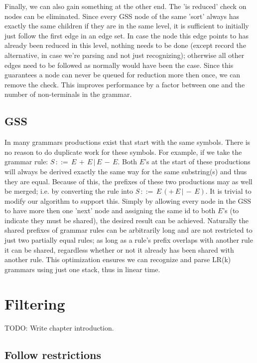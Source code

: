 \documentclass[a4paper,10pt]{article}
\begin{document}
Finally, we can also gain something at the other end. The 'is reduced' check on nodes can be eliminated. Since every GSS node of the same 'sort' always has exactly the same children if they are in the same level, it is sufficient to initially just follow the first edge in an edge set. In case the node this edge points to has already been reduced in this level, nothing needs to be done (except record the alternative, in case we're parsing and not just recognizing); otherwise all other edges need to be followed as normally would have been the case. Since this guarantees a node can never be queued for reduction more then once, we can remove the check. This improves performance by a factor between one and the number of non-terminals in the grammar.

\subsection{GSS}

In many grammars productions exist that start with the same symbols. There is no reason to do duplicate work for these symbols. For example, if we take the grammar rule: $S\,::=\,E\,+\,E\,|\,E\,-\,E$. Both $E$'s at the start of these productions will always be derived exactly the same way for the same substring(s) and thus they are equal. Because of this, the prefixes of these two productions may as well be merged; i.e. by converting the rule into $S\,::=\,E\,(+\,E\,|\,-\,E)$. It is trivial to modify our algorithm to support this. Simply by allowing every node in the GSS to have more then one 'next' node and assigning the same id to both $E$'s (to indicate they must be shared), the desired result can be achieved. Naturally the shared prefixes of grammar rules can be arbitrarily long and are not restricted to just two partially equal rules; as long as a rule's prefix overlaps with another rule it can be shared, regardless whether or not it already has been shared with another rule. This optimization ensures we can recognize and parse LR(k) grammars using just one stack, thus in linear time.

\section{Filtering}

TODO: Write chapter introduction.

\subsection{Follow restrictions}
\end{document}
